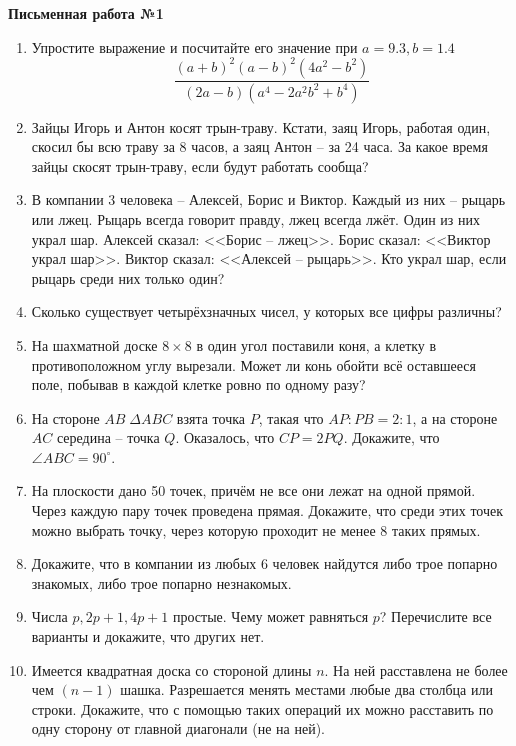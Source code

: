 \documentclass[12pt]{article}
\begin{document}
\centerline{\large \bf Письменная работа №1}
\begin{enumerate}
\item Упростите выражение и посчитайте его значение при $a = 9.3, b = 1.4$
\begin{equation*}
\frac{(a + b)^2(a - b)^2(4a^2 - b^2)}{(2a - b)(a^4 - 2a^2b^2 + b^4)}
\end{equation*}
\item Зайцы Игорь и Антон косят трын-траву. Кстати, заяц Игорь, работая один, скосил бы всю траву за
8 часов, а заяц Антон -- за 24 часа. За какое время зайцы скосят трын-траву, если будут работать
сообща?
\item В компании 3 человека -- Алексей, Борис и Виктор. Каждый из них -- рыцарь или лжец. Рыцарь
всегда говорит правду, лжец всегда лжёт. Один из них украл шар. Алексей сказал: <<Борис -- лжец>>.
Борис сказал: <<Виктор украл шар>>. Виктор сказал: <<Алексей -- рыцарь>>. Кто украл шар, если рыцарь
среди них только один?
\item Сколько существует четырёхзначных чисел, у которых все цифры различны?
\item На шахматной доске $8 \times 8$ в один угол поставили коня, а клетку в противоположном углу вырезали.
Может ли конь обойти всё оставшееся поле, побывав в каждой клетке ровно по одному разу?
\item На стороне $AB \; \Delta ABC$ взята точка $P$, такая что $AP : PB = 2 : 1$, а на стороне $AC$
середина -- точка $Q$. Оказалось, что $CP = 2PQ$. Докажите, что $\angle ABC = 90^{\circ}$.
\item На плоскости дано 50 точек, причём не все они лежат на одной прямой. Через каждую пару точек
проведена прямая. Докажите, что среди этих точек можно выбрать точку, через которую проходит не
менее 8 таких прямых.
\item Докажите, что в компании из  любых 6 человек найдутся либо трое попарно знакомых, либо трое
попарно незнакомых.
\item Числа $p, 2p + 1, 4p + 1$ простые. Чему может равняться $p$? Перечислите все варианты и
докажите, что других нет.
\item Имеется квадратная доска со стороной длины $n$. На ней расставлена не более чем $(n - 1)$
шашка. Разрешается менять местами любые два столбца или строки. Докажите, что с помощью таких
операций их можно расставить по одну сторону от главной диагонали (не на ней).
\end{enumerate}
\end{document}
